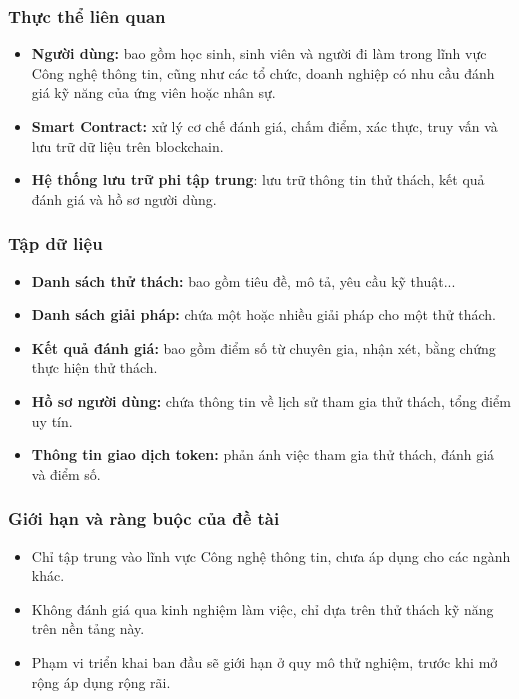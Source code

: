 \documentclass{article}[14pt]
\begin{document}
{    \subsubsection{Thực thể liên quan}
    \begin{itemize}
        \item \textbf{Người dùng:} bao gồm học sinh, sinh viên và người đi làm trong lĩnh vực Công nghệ thông tin, cũng như các tổ chức, doanh nghiệp có nhu cầu đánh giá kỹ năng của ứng viên hoặc nhân sự.
        \item \textbf{Smart Contract:} xử lý cơ chế đánh giá, chấm điểm, xác thực, truy vấn và lưu trữ dữ liệu trên blockchain.
        \item \textbf{Hệ thống lưu trữ phi tập trung}: lưu trữ thông tin thử thách, kết quả đánh giá và hồ sơ người dùng.
    \end{itemize}

    \subsubsection{Tập dữ liệu}
    \begin{itemize}
        \item \textbf{Danh sách thử thách:} bao gồm tiêu đề, mô tả, yêu cầu kỹ thuật...
        \item \textbf{Danh sách giải pháp:} chứa một hoặc nhiều giải pháp cho một thử thách.
        \item \textbf{Kết quả đánh giá:} bao gồm điểm số từ chuyên gia, nhận xét, bằng chứng thực hiện thử thách.
        \item \textbf{Hồ sơ người dùng:} chứa thông tin về lịch sử tham gia thử thách, tổng điểm uy tín.
        \item \textbf{Thông tin giao dịch token:} phản ánh việc tham gia thử thách, đánh giá và điểm số.
    \end{itemize}

    \subsubsection{Giới hạn và ràng buộc của đề tài}
    \begin{itemize}
        \item Chỉ tập trung vào lĩnh vực Công nghệ thông tin, chưa áp dụng cho các ngành khác.
        \item Không đánh giá qua kinh nghiệm làm việc, chỉ dựa trên thử thách kỹ năng trên nền tảng này.
        \item Phạm vi triển khai ban đầu sẽ giới hạn ở quy mô thử nghiệm, trước khi mở rộng áp dụng rộng rãi.
    \end{itemize}
    
}
\end{document}
